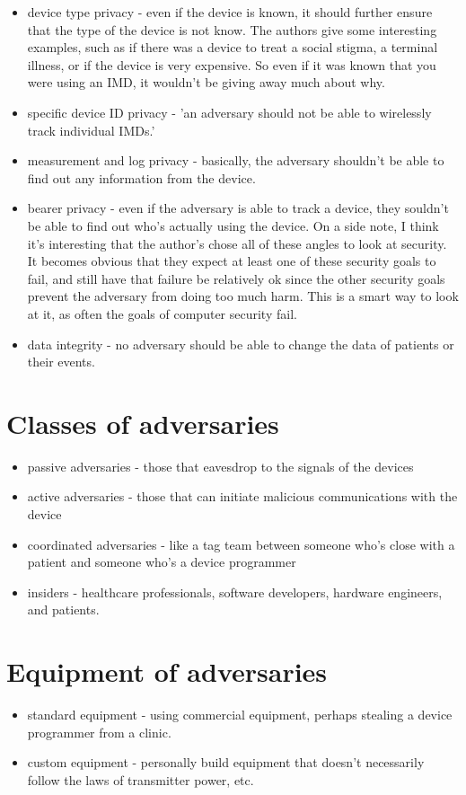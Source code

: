 \documentclass{article}
\begin{document}
\begin{itemize}
\begin{itemize}
\item device type privacy - even if the device is known, it should further ensure that the type of the device is not know. The authors give some interesting examples, such as if there was a device to treat a social stigma, a terminal illness, or if the device is very expensive. So even if it was known that you were using an IMD, it wouldn't be giving away much about why. 
\item specific device ID privacy - 'an adversary should not be able to wirelessly track individual IMDs.' 
\item measurement and log privacy - basically, the adversary shouldn't be able to find out any information from the device.
\item bearer privacy - even if the adversary is able to track a device, they souldn't be able to find out who's actually using the device. On a side note, I think it's interesting that the author's chose all of these angles to look at security. It becomes obvious that they expect at least one of these security goals to fail, and still have that failure be relatively ok since the other security goals prevent the adversary from doing too much harm. This is a smart way to look at it, as often the goals of computer security fail.
\item data integrity - no adversary should be able to change the data of patients or their events.
\end{itemize}
\end{itemize}

\section*{Classes of adversaries}
\begin{itemize}
\item passive adversaries - those that eavesdrop to the signals of the devices
\item active adversaries - those that can initiate malicious communications with the device 
\item coordinated adversaries - like a tag team between someone who's close with a patient and someone who's a device programmer
\item insiders - healthcare professionals, software developers, hardware engineers, and patients.
\end{itemize}

\section*{Equipment of adversaries}
\begin{itemize}
\item standard equipment - using commercial equipment, perhaps stealing a device programmer from a clinic.
\item custom equipment - personally build equipment that doesn't necessarily follow the laws of transmitter power, etc.
\end{itemize}
\end{document}
